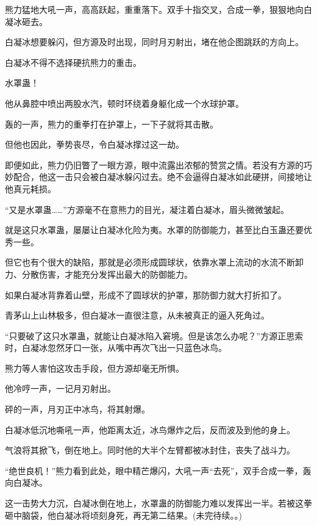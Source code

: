 \begin{this_body}
熊力猛地大吼一声，高高跃起，重重落下。双手十指交叉，合成一拳，狠狠地向白凝冰砸去。

白凝冰想要躲闪，但方源及时出现，同时月刃射出，堵在他企图跳跃的方向上。

白凝冰不得不选择硬抗熊力的重击。

水罩蛊！

他从鼻腔中喷出两股水汽，顿时环绕着身躯化成一个水球护罩。

轰的一声，熊力的重拳打在护罩上，一下子就将其击散。

但他也因此，拳势丧尽，令白凝冰撑过这一劫。

即便如此，熊力仍旧瞥了一眼方源，眼中流露出浓郁的赞赏之情。若没有方源的巧妙配合，他这一击只会被白凝冰躲闪过去。绝不会逼得白凝冰如此硬拼，间接地让他真元耗损。

“又是水罩蛊……”方源毫不在意熊力的目光，凝注着白凝冰，眉头微微皱起。

就是这只水罩蛊，屡屡让白凝冰化险为夷。水罩的防御能力，甚至比白玉蛊还要优秀一些。

但它也有个很大的缺陷，那就是必须形成圆球状，依靠水罩上流动的水流不断卸力、分散伤害，才能充分发挥出最大的防御能力。

如果白凝冰背靠着山壁，形成不了圆球状的护罩，那防御力就大打折扣了。

青茅山上山林极多，但白凝冰一直很注意，从未被真正的逼入死角过。

“只要破了这只水罩蛊，就能让白凝冰陷入窘境。但是该怎么办呢？”方源正思索时，白凝冰忽然牙口一张，从嘴中再次飞出一只蓝色冰鸟。

熊力等人害怕这攻击手段，但方源却毫无所惧。

他冷哼一声，一记月刃射出。

砰的一声，月刃正中冰鸟，将其射爆。

白凝冰低沉地嘶吼一声，他距离太近，冰鸟爆炸之后，反而波及到他的身上。

气浪将其掀飞，倒在地上。同时他的大半个左臂都被冰封住，丧失了战斗力。

“绝世良机！”熊力看到此处，眼中精芒爆闪，大吼一声“去死”，双手合成一拳，轰向白凝冰。

这一击势大力沉，白凝冰倒在地上，水罩蛊的防御能力难以发挥出一半。若被这拳砸中脑袋，他白凝冰将顷刻身死，再无第二结果。(未完待续。。)

\end{this_body}

